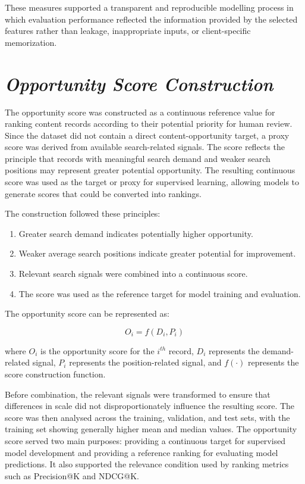 \documentclass[12pt,a4paper]{report}
\begin{document}
These measures supported a transparent and reproducible modelling process in which evaluation performance reflected the information provided by the selected features rather than leakage, inappropriate inputs, or client-specific memorization.

\section{\textit{Opportunity Score Construction}}
The opportunity score was constructed as a continuous reference value for ranking content records according to their potential priority for human review. Since the dataset did not contain a direct content-opportunity target, a proxy score was derived from available search-related signals. The score reflects the principle that records with meaningful search demand and weaker search positions may represent greater potential opportunity. The resulting continuous score was used as the target or proxy for supervised learning, allowing models to generate scores that could be converted into rankings.

The construction followed these principles:

\begin{enumerate}
    \item Greater search demand indicates potentially higher opportunity.
    \item Weaker average search positions indicate greater potential for improvement.
    \item Relevant search signals were combined into a continuous score.
    \item The score was used as the reference target for model training and evaluation.
\end{enumerate}

The opportunity score can be represented as:

\begin{equation}
O_i = f(D_i, P_i)
\end{equation}

where $O_i$ is the opportunity score for the $i^{th}$ record, $D_i$ represents the demand-related signal, $P_i$ represents the position-related signal, and $f(\cdot)$ represents the score construction function.

Before combination, the relevant signals were transformed to ensure that differences in scale did not disproportionately influence the resulting score. The score was then analysed across the training, validation, and test sets, with the training set showing generally higher mean and median values. The opportunity score served two main purposes: providing a continuous target for supervised model development and providing a reference ranking for evaluating model predictions. It also supported the relevance condition used by ranking metrics such as Precision@K and NDCG@K.
\end{document}
